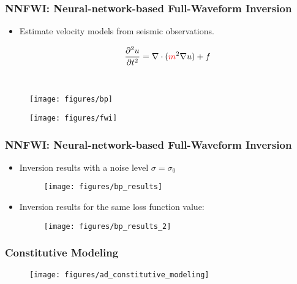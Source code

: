 \documentclass[usenames,dvipsnames]{beamer}
\begin{document}
\begin{frame}
	\frametitle{NNFWI: Neural-network-based Full-Waveform Inversion}
	
	\begin{itemize}
		\item Estimate velocity models from seismic observations. 
	\end{itemize}
	\begin{minipage}[t]{0.3\textwidth}
		\begin{equation*}
\qquad\frac{\partial^2 u}{\partial t^2} = \nabla \cdot (\textcolor{red}{m}^2 \nabla u) + f
\end{equation*}
	\end{minipage}~
	\begin{minipage}[t]{0.69\textwidth}
	\begin{figure}[hbt]
	\centering
  \texttt{[image: figures/bp]}
\end{figure}
\end{minipage}
	


\begin{figure}[hbt]
  \texttt{[image: figures/fwi]}
\end{figure}
\end{frame}

\begin{frame}
	\frametitle{NNFWI: Neural-network-based Full-Waveform Inversion}

\begin{itemize}
	\item Inversion results with a noise level $\sigma = \sigma_0$
	\begin{figure}[hbt]
	\centering
  \texttt{[image: figures/bp\_results]}
\end{figure}

\item Inversion results for the same loss function value:
\begin{figure}[hbt]
\centering
  \texttt{[image: figures/bp\_results\_2]}
\end{figure}

\end{itemize}

\end{frame}

\begin{frame}
	\frametitle{Constitutive Modeling}
	
	\begin{figure}[hbt]
\centering
  \texttt{[image: figures/ad\_constitutive\_modeling]}
\end{figure}
\end{frame}
\end{document}
